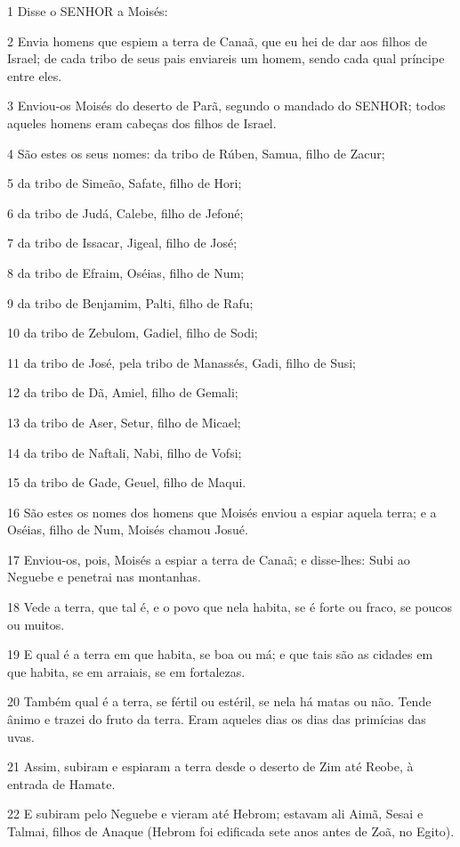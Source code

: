 \par 1 Disse o SENHOR a Moisés:
\par 2 Envia homens que espiem a terra de Canaã, que eu hei de dar aos filhos de Israel; de cada tribo de seus pais enviareis um homem, sendo cada qual príncipe entre eles.
\par 3 Enviou-os Moisés do deserto de Parã, segundo o mandado do SENHOR; todos aqueles homens eram cabeças dos filhos de Israel.
\par 4 São estes os seus nomes: da tribo de Rúben, Samua, filho de Zacur;
\par 5 da tribo de Simeão, Safate, filho de Hori;
\par 6 da tribo de Judá, Calebe, filho de Jefoné;
\par 7 da tribo de Issacar, Jigeal, filho de José;
\par 8 da tribo de Efraim, Oséias, filho de Num;
\par 9 da tribo de Benjamim, Palti, filho de Rafu;
\par 10 da tribo de Zebulom, Gadiel, filho de Sodi;
\par 11 da tribo de José, pela tribo de Manassés, Gadi, filho de Susi;
\par 12 da tribo de Dã, Amiel, filho de Gemali;
\par 13 da tribo de Aser, Setur, filho de Micael;
\par 14 da tribo de Naftali, Nabi, filho de Vofsi;
\par 15 da tribo de Gade, Geuel, filho de Maqui.
\par 16 São estes os nomes dos homens que Moisés enviou a espiar aquela terra; e a Oséias, filho de Num, Moisés chamou Josué.
\par 17 Enviou-os, pois, Moisés a espiar a terra de Canaã; e disse-lhes: Subi ao Neguebe e penetrai nas montanhas.
\par 18 Vede a terra, que tal é, e o povo que nela habita, se é forte ou fraco, se poucos ou muitos.
\par 19 E qual é a terra em que habita, se boa ou má; e que tais são as cidades em que habita, se em arraiais, se em fortalezas.
\par 20 Também qual é a terra, se fértil ou estéril, se nela há matas ou não. Tende ânimo e trazei do fruto da terra. Eram aqueles dias os dias das primícias das uvas.
\par 21 Assim, subiram e espiaram a terra desde o deserto de Zim até Reobe, à entrada de Hamate.
\par 22 E subiram pelo Neguebe e vieram até Hebrom; estavam ali Aimã, Sesai e Talmai, filhos de Anaque (Hebrom foi edificada sete anos antes de Zoã, no Egito).

